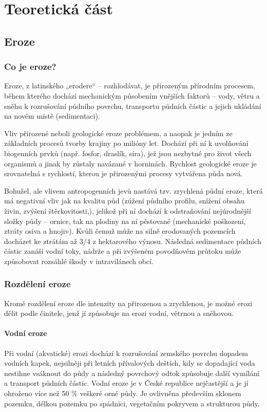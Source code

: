 
\part{Teoretická část}

\chapter{Eroze}
\section{Co je eroze?}
Eroze, z latinského „erodere“ – rozhlodávat, je přirozeným přírodním procesem, během kterého dochází mechanickým působením vnějších faktorů – vody, větru a sněhu k rozrušování půdního povrchu, transportu půdních částic a jejich ukládání na novém místě (sedimentaci).

Vliv přirozené neboli geologické eroze problémem, a naopak je jedním ze základních procesů tvorby krajiny po milióny let. Dochází při ní k uvolňování biogenních prvků (např. fosfor, draslík, síra), jež jsou nezbytné pro život všech organismů a jinak by zůstaly navázané v horninách. Rychlost geologické eroze je srovnatelná s rychlostí, kterou je přirozenými procesy vytvářena půda nová.

Bohužel, ale vlivem antropogenních jevů nastává tzv. zrychlená půdní eroze, která má negativní vliv jak na kvalitu půd (zúžení půdního profilu, snížení obsahu živin, zvýšení štěrkovitosti,), jelikož při ní dochází k odstraňování nejúrodnější složky půdy – ornice, tak na plodiny na ní pěstované (mechanické poškození, ztráty osiva a hnojiv). Kvůli čemuž může na silně erodovaných pozemcích docházet ke ztrátám až 3/4 z hektarového výnosu. Následná sedimentace půdních částic zanáší vodní toky, nádrže a při zvýšeném povodňovém průtoku může způsobovat rozsáhlé škody v intravilánech obcí.
\section{Rozdělení eroze}
Kromě rozdělení eroze dle intenzity na přirozenou a zrychlenou, je možné erozi dělit podle činitele, jenž jí způsobuje na erozi vodní, větrnou a sněhovou.
\subsection{Vodní eroze}
Při vodní (akvatické) erozi dochází k rozrušování zemského povrchu dopadem vodních kapek, nejsilněji při letních přívalových deštích, kdy se dopadající voda nestihne vsáknout do půdy a následný povrchový odtok způsobuje další vymílání a transport půdních částic. Vodní eroze je v České republice nejčastější a je jí ohroženo více než 50 \% veškeré orné půdy. Je ovlivněna především sklonem pozemku, délkou pozemku po spádnici, vegetačním pokryvem a strukturou půdy.

